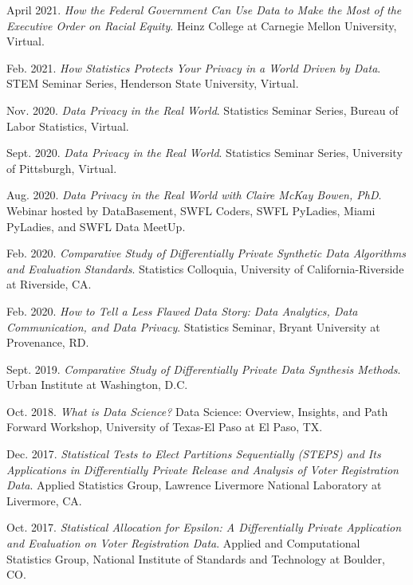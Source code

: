 \documentclass[11pt, letterpaper, roman]{moderncv} %
\begin{document}
\begin{etaremune}[topsep=0pt, itemsep=3pt, partopsep=0pt, parsep=0pt]
    \item April 2021. \textit{How the Federal Government Can Use Data to Make the Most of the Executive Order on Racial Equity}. Heinz College at Carnegie Mellon University, Virtual.

    \item Feb. 2021. \textit{How Statistics Protects Your Privacy in a World Driven by Data}. STEM Seminar Series, Henderson State University, Virtual.

    \item Nov. 2020. \textit{Data Privacy in the Real World}. Statistics Seminar Series, Bureau of Labor Statistics, Virtual.

    \item Sept. 2020. \textit{Data Privacy in the Real World}. Statistics Seminar Series, University of Pittsburgh, Virtual.
        
    \item Aug. 2020. \textit{Data Privacy in the Real World with Claire McKay Bowen, PhD}. Webinar hosted by DataBasement, SWFL Coders, SWFL PyLadies, Miami PyLadies, and SWFL Data MeetUp.
    
    \item Feb. 2020. \textit{Comparative Study of Differentially Private Synthetic Data Algorithms and Evaluation Standards}. Statistics Colloquia, University of California-Riverside at Riverside, CA.
    
    \item Feb. 2020. \textit{How to Tell a Less Flawed Data Story: Data Analytics, Data Communication, and Data Privacy}. Statistics Seminar, Bryant University at Provenance, RD.
    
    \item Sept. 2019. \textit{Comparative Study of Differentially Private Data Synthesis Methods}. Urban Institute at Washington, D.C.
    
    \item Oct. 2018. \textit{What is Data Science?} Data Science: Overview, Insights, and Path Forward Workshop, University of Texas-El Paso at El Paso, TX.
    
    \item Dec. 2017. \textit{Statistical Tests to Elect Partitions Sequentially (STEPS) and Its Applications in Differentially Private Release and Analysis of Voter Registration Data}. Applied Statistics Group, Lawrence Livermore National Laboratory at Livermore, CA.
    
    \item Oct. 2017. \textit{Statistical Allocation for Epsilon: A Differentially Private Application and Evaluation on Voter Registration Data}. Applied and Computational Statistics Group, National Institute of Standards and Technology at Boulder, CO.
    

\end{etaremune}
\end{document}
